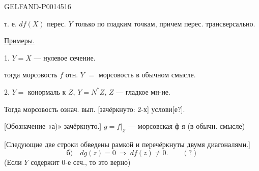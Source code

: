 \begin{GelfandAdjacentEvidence}{GELFAND-P001451}{6}


т. е. \(df(X)\) перес. \(Y\) только по гладким точкам, причем перес. трансверсально.

\uline{Примеры.}

1. \(Y=X\) — нулевое сечение.

тогда морсовость \(f\) отн. \(Y\) \(=\) морсовость в обычном смысле.

2. \(Y=\) конормаль к \(Z\), \(Y=N^{*}Z\), \(Z\) — гладкое мн-ие.

Тогда морсовость означ. вып. [зачёркнуто: 2-х] услови[е?].
\end{GelfandAdjacentEvidence}


[Обозначение «а)» зачёркнуто.]
\(g=f|_Z\) — морсовская ф-я (в обычн. смысле)

[Следующие две строки обведены рамкой и перечёркнуты двумя диагоналями.]
\[
\text{б)}\quad dg(z)=0\ \Rightarrow\ df(z)\ne0.\qquad (?)
\]
(Если \(Y\) содержит 0-е сеч., то это верно)


